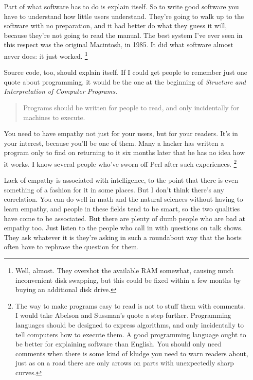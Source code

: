 \documentclass[12pt]{book}
\begin{document}
Part of what software has to do is explain itself. So to write good
software you have to understand how little users understand. They're
going to walk up to the software with no preparation, and it had better
do what they guess it will, because they're not going to read the
manual. The best system I've ever seen in this respect was the original
Macintosh, in 1985. It did what software almost never does: it just
worked. \footnote{Well, almost. They overshot the available RAM somewhat, causing
much inconvenient disk swapping, but this could be fixed within a few
months by buying an additional disk drive.}

Source code, too, should explain itself. If I could get people to
remember just one quote about programming, it would be the one at the
beginning of \emph{Structure and Interpretation of Computer Programs.}

\begin{quote}
Programs should be written for people to read, and only incidentally for
machines to execute.
\end{quote}

You need to have empathy not just for your users, but for your readers.
It's in your interest, because you'll be one of them. Many a hacker has
written a program only to find on returning to it six months later that
he has no idea how it works. I know several people who've sworn off Perl
after such experiences. \footnote{The way to make programs easy to read is not to stuff them with
comments. I would take Abelson and Sussman's quote a step further.
Programming languages should be designed to express algorithms, and only
incidentally to tell computers how to execute them. A good programming
language ought to be better for explaining software than English. You
should only need comments when there is some kind of kludge you need to
warn readers about, just as on a road there are only arrows on parts
with unexpectedly sharp curves.}

Lack of empathy is associated with intelligence, to the point that there
is even something of a fashion for it in some places. But I don't think
there's any correlation. You can do well in math and the natural
sciences without having to learn empathy, and people in these fields
tend to be smart, so the two qualities have come to be associated. But
there are plenty of dumb people who are bad at empathy too. Just listen
to the people who call in with questions on talk shows. They ask
whatever it is they're asking in such a roundabout way that the hosts
often have to rephrase the question for them.
\end{document}
